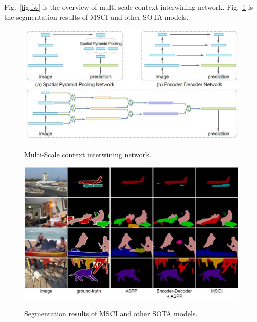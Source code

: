 \documentclass[]{IEEEtran}
\begin{document}
	Fig.~\ref{fig:fw} is the overview of multi-scale context interwining network. Fig.~\ref{fig:rt} is the segmentation results of MSCI and other SOTA models.
	


\newpage
\begin{figure}[!hbt]
		\vspace{1.7cm}
		\begin{center}
			\includegraphics[width=\columnwidth]{fw}
			\caption{Multi-Scale context interwining network.}
			\label{fig:fw}
		    \hspace{0.5cm}
			\includegraphics[width=\columnwidth]{rs}
			\caption{Segmentation results of MSCI and other SOTA models.}
			\label{fig:rt}
		\end{center}
	\end{figure}
\end{document}

